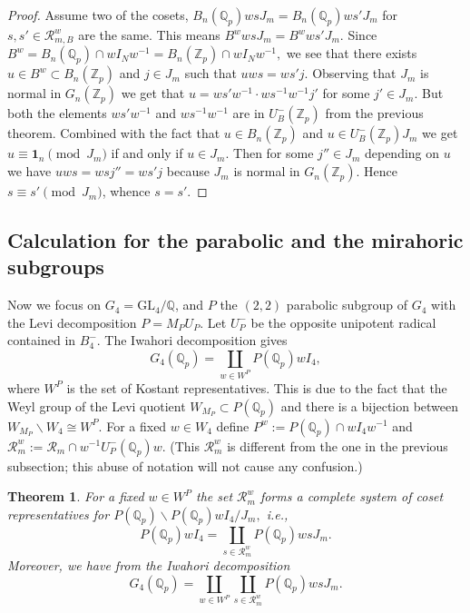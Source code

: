 \documentclass[11pt]{amsart}
\newtheorem{theorem}{Theorem}[section]
\newcommand{\GL}{\mathrm{GL}}
\begin{document}
\begin{proof}
	Assume two of the cosets, $B_n(\mathbb{Q}_p) ws J_m = B_n(\mathbb{Q}_p) ws' J_m$ for $s, s' \in \mathcal{R}_{m,B}^w$ are the same. 
	This means $B^w ws J_m = B^w ws' J_m.$ Since $B^w = B_n(\mathbb{Q}_p) \cap w I_N w^{-1} = B_n(\mathbb{Z}_p) \cap w I_N w^{-1},$ 
	we see that there exists $u\in B^w \subset B_n(\mathbb{Z}_p)$ and $j \in J_m$ such that $u ws = ws' j.$
	Observing that $J_m$ is normal in $G_n(\mathbb{Z}_p)$ we get that
	$u = ws'w^{-1} \cdot w s^{-1} w^{-1} j'$  
	for some $j' \in J_m.$ But both the elements $ ws'w^{-1}$ and $w s^{-1} w^{-1}$ are in $U_B^{-}(\mathbb{Z}_p)$ from the previous theorem. 
	Combined with the fact that $u \in B_n(\mathbb{Z}_p)$ and $ u \in U_B^{-}(\mathbb{Z}_p)J_m$ we get 
	$u \equiv \textbf{1}_n \pmod {J_m}$  if and only if $u \in J_m.$
	Then for some $j'' \in J_m$ depending on $u$ we have 
	$u ws = ws j'' = ws'j$ because  $J_m$ is normal in $G_n(\mathbb{Z}_p).$ Hence $s\equiv s' \pmod{J_m}$, whence $s = s'.$
\end{proof}



\subsection{Calculation for the parabolic and the mirahoric subgroups}

Now we focus on $G_4 = \GL_4/\mathbb{Q}$, and $P$ the $(2,2)$ parabolic subgroup of $G_4$ with the Levi decomposition $P = M_PU_P.$ Let $U_P^-$ be the opposite unipotent radical contained in $B_4^-.$
The Iwahori decomposition gives 
\[ G_4(\mathbb{Q}_p) = \coprod_{w \in W^P} P(\mathbb{Q}_p) w I_4,\]
where $W^P$ is the set of Kostant representatives.
This is due to the fact that the Weyl group of the Levi quotient $W_{M_P} \subset P(\mathbb{Q}_p)$ and 
there is a bijection between $W_{M_P} \backslash W_4 \cong W^P.$ 
For a fixed $w \in W_4$ define $P^w := P(\mathbb{Q}_p) \cap wI_4 w^{-1}$ and $\mathcal{R}^w_m := \mathcal{R}_m \cap w^{-1} U_P^{-}(\mathbb{Q}_p) w.$ 
(This $\mathcal{R}_m^w$ is different from the one in the previous subsection; this abuse of notation will not cause any confusion.)

\begin{theorem}\label{thm: coset-parabolic-principal}
	For a fixed $w \in W^P$ the set $\mathcal{R}^w_m$ forms a complete system of coset representatives for 
	$P(\mathbb{Q}_p) \backslash P(\mathbb{Q}_p)wI_4/J_m,$ i.e., 
	\[ P(\mathbb{Q}_p)wI_4 = \coprod_{s \in \mathcal{R}_m^w} P(\mathbb{Q}_p)w s J_m.\]
	Moreover, we have from the Iwahori decomposition
	\[ G_4(\mathbb{Q}_p) = \coprod_{w \in W^P} \coprod_{s \in \mathcal{R}_m^w} P(\mathbb{Q}_p)w s J_m.\]
\end{theorem}
\end{document}
